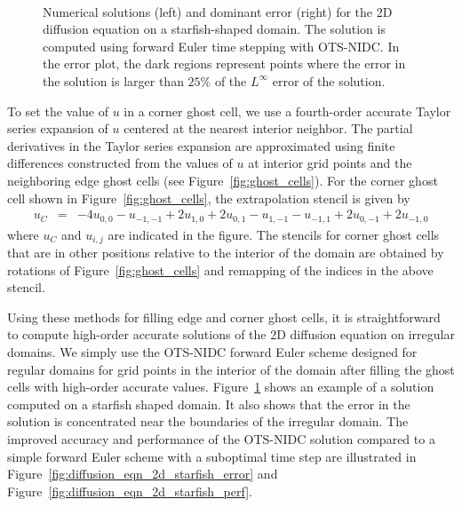 \documentclass[fleqn,12pt,twoside]{article}
\newcommand{\bea}{\begin{eqnarray}}
\newcommand{\eea}{\end{eqnarray}}
\begin{document}
\begin{figure}[tb]
\begin{center}
\ \ \ \ \ \ \ 
\caption{Numerical solutions (left) and dominant error (right) for the 2D 
diffusion equation on a starfish-shaped domain.  The solution is computed 
using forward Euler time stepping with OTS-NIDC.  In the error plot, the dark 
regions represent points where the error in the solution is larger than 
$25$\% of the $L^\infty$ error of the solution.  
}
\label{fig:diffusion_eqn_2d_starfish_domain}
\end{center}
\end{figure}

To set the value of $u$ in a corner ghost cell, we use a fourth-order accurate
Taylor series expansion of $u$ centered at the nearest interior 
neighbor.  The partial derivatives in the Taylor series expansion are 
approximated using finite differences constructed from the values of $u$ 
at interior grid points and the neighboring edge ghost cells (see 
Figure~\ref{fig:ghost_cells}).  For the corner ghost cell shown 
in Figure~\ref{fig:ghost_cells}, the extrapolation stencil is given by
\bea
  u_C &=&  -4 u_{0,0} - u_{-1,-1} + 2 u_{1,0} + 2 u_{0,1}
      - u_{1,-1} - u_{-1,1} + 2 u_{0,-1} + 2 u_{-1,0}
\eea
where $u_C$ and $u_{i,j}$ are indicated in the figure.  The stencils for
corner ghost cells that are in other positions relative to the interior of 
the domain are obtained by rotations of Figure~\ref{fig:ghost_cells} and 
remapping of the indices in the above stencil.

Using these methods for filling edge and corner ghost cells, it is 
straightforward to compute high-order accurate solutions of the 2D diffusion 
equation on irregular domains.  We simply use the OTS-NIDC forward Euler 
scheme designed for regular domains for grid points in the interior of the 
domain after filling the ghost cells with high-order accurate values.  
Figure~\ref{fig:diffusion_eqn_2d_starfish_domain} shows an example of 
a solution computed on a starfish shaped domain.  It also shows that the 
error in the solution is concentrated near the boundaries of the irregular
domain.  The improved accuracy and performance of the OTS-NIDC solution
compared to a simple forward Euler scheme with a suboptimal time step are
illustrated in Figure~\ref{fig:diffusion_eqn_2d_starfish_error} and
Figure~\ref{fig:diffusion_eqn_2d_starfish_perf}. 
\end{document}
